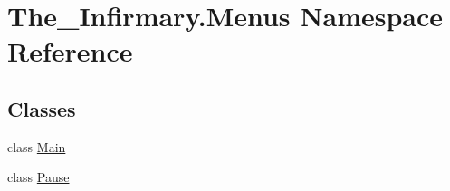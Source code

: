 \hypertarget{namespace_the___infirmary_1_1_menus}{}\section{The\+\_\+\+Infirmary.\+Menus Namespace Reference}
\label{namespace_the___infirmary_1_1_menus}
\subsection*{Classes}
\begin{DoxyCompactItemize}
\item 
class \mbox{\hyperlink{class_the___infirmary_1_1_menus_1_1_main}{Main}}
\item 
class \mbox{\hyperlink{class_the___infirmary_1_1_menus_1_1_pause}{Pause}}
\end{DoxyCompactItemize}
